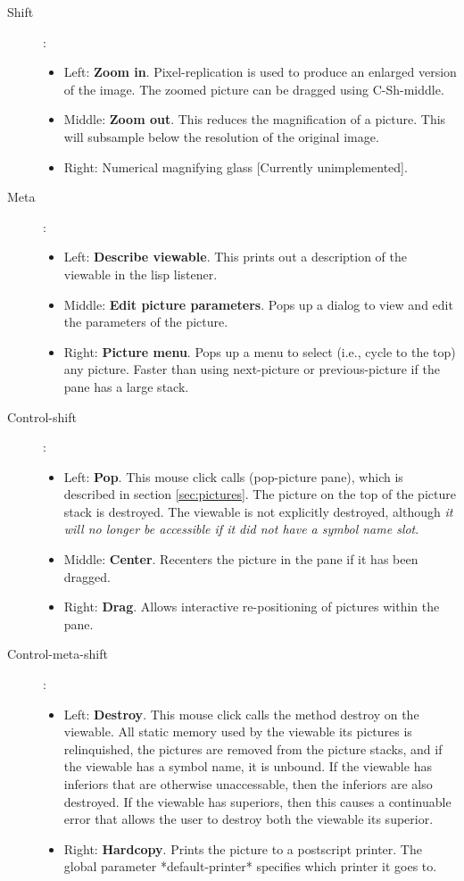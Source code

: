 \begin{description}
\item [Shift]:
\begin{itemize}
\item  Left: {\bf Zoom in}.  Pixel-replication is used to produce an
enlarged version of the image.  The zoomed picture can be dragged
using C-Sh-middle.
\item Middle: {\bf Zoom out}.  This reduces the magnification of a
picture.  This will subsample below the resolution of the original
image.
\item  Right: Numerical magnifying glass  [Currently unimplemented].
\end{itemize}

\item [Meta]:
\begin{itemize} 
\item Left: {\bf Describe viewable}.  This prints out a description of the
viewable in the lisp listener. 
\item  Middle: {\bf Edit picture parameters}.  Pops up a dialog to view and edit
the parameters of the picture.
\item  Right: {\bf Picture menu}.  Pops up a menu to select (i.e., cycle to
the top) any picture.  Faster than using next-picture or
previous-picture if the pane has a large stack.
\end{itemize}

\item [Control-shift]:
\begin{itemize}
\item Left: {\bf Pop}.  This mouse click calls (pop-picture pane),
which is described in section \ref{sec:pictures}.  The picture on the
top of the picture stack is destroyed. The viewable is not explicitly
destroyed, although {\em it will no longer be accessible if it did not
have a symbol name slot}.
\item  Middle: {\bf Center}.  Recenters the picture in the pane if it
has been dragged.
\item  Right: {\bf Drag}.  Allows interactive re-positioning of
pictures within the pane.
\end{itemize}

\item [Control-meta-shift]:
\begin{itemize}
\item Left: {\bf Destroy}.  This mouse click calls the method destroy
on the viewable.  All static memory used by the viewable its pictures
is relinquished, the pictures are removed from the picture stacks, and if
the viewable has a symbol name, it is unbound.  If the viewable has
inferiors that are otherwise unaccessable, then the inferiors are also
destroyed.  If the viewable has superiors, then this causes a
continuable error that allows the user to destroy both the viewable
its superior.
\item Right: {\bf Hardcopy}.  Prints the picture to a postscript
printer.  The global parameter *default-printer* specifies which
printer it goes to.
\end{itemize}


\end{description}
